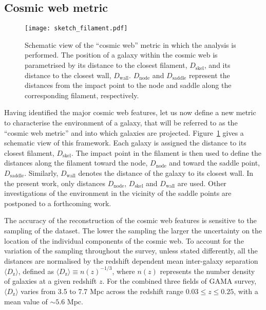 \documentclass[useAMS,usenatbib]{mnras}
\begin{document}
\subsection{Cosmic web metric}
\label{subsec:metric}


\begin{figure}
\texttt{[image: sketch\_filament.pdf]}
\caption{Schematic view of the ``cosmic web'' metric in which the analysis is  performed. The position of a galaxy within the cosmic web is parametrised by its distance to the closest filament, $D_{\mathrm{skel}}$, and its distance to the closest wall, $D_{\mathrm{wall}}$. $D_{\mathrm{node}}$ and $D_{\mathrm{saddle}}$ represent the distances from the impact point to the node and saddle along the corresponding filament, respectively. 
}
\label{Fig:sketch_filament}
\end{figure}

Having identified the major cosmic web features, let us now define a new metric to characterise the environment of a galaxy, that will be referred to as the ``cosmic web metric'' and into which galaxies are projected.
Figure~\ref{Fig:sketch_filament} gives a schematic view of this framework. 
Each galaxy is assigned the distance to its closest filament, $D_{\mathrm{skel}}$.  
The impact point in the filament is then used to define the distances  along the filament toward the node, $D_{\mathrm{node}}$ and toward the saddle point,  $D_{\mathrm{saddle}}$.
Similarly, $D_{\mathrm{wall}}$ denotes the distance of the galaxy to its closest wall. 
In the present work, only distances $D_{\mathrm{node}}$, $D_{\mathrm{skel}}$ and $D_{\mathrm{wall}}$ are used. 
Other investigations of the environment in the vicinity of the saddle points are postponed to a forthcoming work.       



The accuracy of the reconstruction of the cosmic web features is sensitive to the sampling of the dataset. The lower the sampling the larger the uncertainty on the location of the individual components of the cosmic web.
To account for the variation of the sampling throughout the survey, unless stated differently, all the distances are normalised by the redshift dependent mean inter-galaxy separation $\langle D_{\mathrm{z}} \rangle$, defined as $\langle D_{\mathrm{z}} \rangle \equiv n(z)^{-1/3}$, where $n(z)$ represents the number density of galaxies at a given redshift $z$. For the combined three fields of GAMA survey,  $\langle D_{\mathrm{z}} \rangle$ varies from 3.5 to 7.7 Mpc across the redshift range $0.03 \leq z \leq 0.25$, with a mean value of $\sim 5.6$ Mpc.
\end{document}
